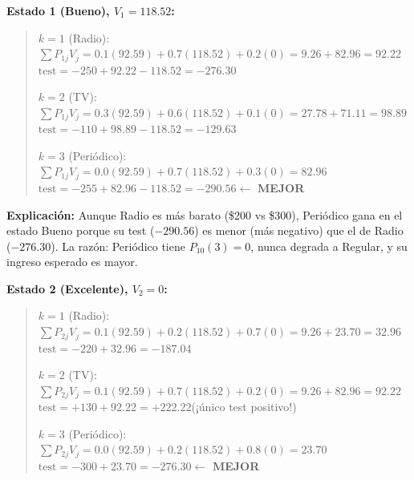 \documentclass[12pt,a4paper]{article}
\begin{document}
\vspace{0.3cm}
\textbf{Estado 1 (Bueno), $V_1 = 118.52$:}

\begin{quote}\footnotesize
$k=1$ (Radio):\;
$\sum P_{1j}V_j = 0.1(92.59) + 0.7(118.52) + 0.2(0) = 9.26 + 82.96 = 92.22$ \\
\hspace*{1.8cm} $\text{test} = -250 + 92.22 - 118.52 = -276.30$

\vspace{4pt}
$k=2$ (TV):\;
$\sum P_{1j}V_j = 0.3(92.59) + 0.6(118.52) + 0.1(0) = 27.78 + 71.11 = 98.89$ \\
\hspace*{1.8cm} $\text{test} = -110 + 98.89 - 118.52 = -129.63$

\vspace{4pt}
$k=3$ (Periódico):\;
$\sum P_{1j}V_j = 0.0(92.59) + 0.7(118.52) + 0.3(0) = 82.96$ \\
\hspace*{1.8cm} $\text{test} = -255 + 82.96 - 118.52 = \mathbf{-290.56}$\quad $\leftarrow$ \textbf{MEJOR}
\end{quote}

\textbf{Explicación:} Aunque Radio es más barato (\$200 vs \$300), Periódico gana en el estado Bueno porque su test ($-290.56$) es menor (más negativo) que el de Radio ($-276.30$). La razón: Periódico tiene $P_{10}(3)=0$, nunca degrada a Regular, y su ingreso esperado es mayor.

\vspace{0.3cm}
\textbf{Estado 2 (Excelente), $V_2 = 0$:}

\begin{quote}\footnotesize
$k=1$ (Radio):\;
$\sum P_{2j}V_j = 0.1(92.59) + 0.2(118.52) + 0.7(0) = 9.26 + 23.70 = 32.96$ \\
\hspace*{1.8cm} $\text{test} = -220 + 32.96 = -187.04$

\vspace{4pt}
$k=2$ (TV):\;
$\sum P_{2j}V_j = 0.1(92.59) + 0.7(118.52) + 0.2(0) = 9.26 + 82.96 = 92.22$ \\
\hspace*{1.8cm} $\text{test} = +130 + 92.22 = \mathbf{+222.22}$\quad (¡único test positivo!)

\vspace{4pt}
$k=3$ (Periódico):\;
$\sum P_{2j}V_j = 0.0(92.59) + 0.2(118.52) + 0.8(0) = 23.70$ \\
\hspace*{1.8cm} $\text{test} = -300 + 23.70 = \mathbf{-276.30}$\quad $\leftarrow$ \textbf{MEJOR}
\end{quote}
\end{document}
